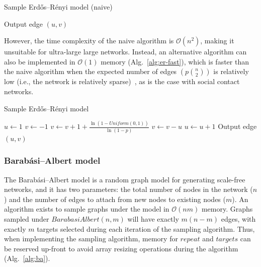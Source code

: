 \documentclass[a4paper,num-refs,gigabyte]{oup-contemporary}
\begin{document}
\begin{algorithm}[H]
\caption{Sample Erd{\H o}s--R\'enyi model (naive)}
\label{alg:er-naive}
\begin{algorithmic}[1]
        \State Output edge $\left(u,v\right)$
      \EndIf
    \EndFor
  \EndFor
\EndProcedure
\end{algorithmic}
\end{algorithm}

However, the time complexity of the naive algorithm is $\mathcal{O}\left(n^2\right)$, making it unsuitable for ultra-large large networks. Instead, an alternative algorithm can also be implemented in $\mathcal{O}\left(1\right)$ memory (Alg.~\ref{alg:er-fast}), which is faster than the naive algorithm when the expected number of edges $\left(p{n\choose 2}\right)$ is relatively low (i.e., the network is relatively sparse)~\cite{Batagelj2005}, as is the case with social contact networks.

\begin{algorithm}[H]
\caption{Sample Erd{\H o}s--R\'enyi model}
\label{alg:er-fast}
\begin{algorithmic}[1]
  \State $u\gets1$
  \State $v\gets-1$
    \State $v\gets v+1+\frac{\ln\left(1-Uniform\left(0,1\right)\right)}{\ln\left(1-p\right)}$
      \State $v\gets v-u$
      \State $u\gets u+1$
    \EndWhile
      \State Output edge $\left(u,v\right)$
    \EndIf
  \EndWhile
\EndProcedure
\end{algorithmic}
\end{algorithm}

\subsubsection{Barab\'asi--Albert model}
The Barab\'asi--Albert model is a random graph model for generating scale-free networks, and it has two parameters: the total number of nodes in the network ($n$) and the number of edges to attach from new nodes to existing nodes ($m$). An algorithm exists to sample graphs under the model in $\mathcal{O}\left(nm\right)$ memory. Graphs sampled under $BarabasiAlbert\left(n,m\right)$ will have exactly $m\left(n-m\right)$ edges, with exactly $m$ targets selected during each iteration of the sampling algorithm. Thus, when implementing the sampling algorithm, memory for $repeat$ and $targets$ can be reserved up-front to avoid array resizing operations during the algorithm (Alg.~\ref{alg:ba}).
\end{document}
